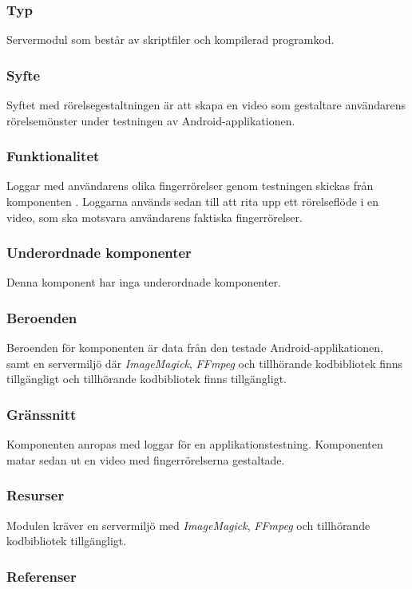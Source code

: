 \subsubsection{Typ}
Servermodul som består av skriptfiler och kompilerad programkod.

\subsubsection{Syfte}
Syftet med rörelsegestaltningen är att skapa en video som gestaltare användarens rörelsemönster under testningen av Android-applikationen.

\subsubsection{Funktionalitet}
Loggar med användarens olika fingerrörelser genom testningen skickas från komponenten . Loggarna används sedan till att rita upp ett rörelseflöde i en video, som ska motsvara användarens faktiska fingerrörelser.

\subsubsection{Underordnade komponenter}
Denna komponent har inga underordnade komponenter.

\subsubsection{Beroenden}
Beroenden för komponenten är data från den testade Android-applikationen, samt en servermiljö där \textit{ImageMagick}, \textit{FFmpeg} och tillhörande kodbibliotek finns tillgängligt och tillhörande kodbibliotek finns tillgängligt.

\subsubsection{Gränssnitt}
Komponenten anropas med loggar för en applikationstestning. Komponenten matar sedan ut en video med fingerrörelserna gestaltade.

\subsubsection{Resurser}
Modulen kräver en servermiljö med \textit{ImageMagick}, \textit{FFmpeg} och tillhörande kodbibliotek tillgängligt.

\subsubsection{Referenser}

